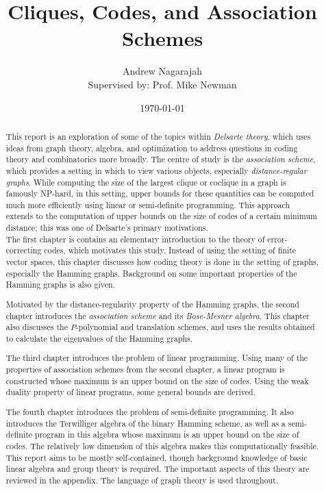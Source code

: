 \documentclass{report}
\title{Cliques, Codes, and Association Schemes}
\author{
  Andrew Nagarajah \\
  Supervised by: Prof. Mike Newman
}
\date{\today}
\begin{document}
\maketitle

\begin{abstract}

  This report is an exploration of some of the topics within \emph{Delsarte
  theory}, which uses ideas from graph theory, algebra, and optimization to
  address questions in coding theory and combinatorics more
  broadly.  The centre of study is the \emph{association scheme}, which provides
  a setting in which to view various objects, especially \emph{distance-regular
  graphs}.  While computing the size of the largest clique or coclique in a
  graph is famously NP-hard, in this setting, upper bounds for these quantities
  can be computed much more efficiently using linear or semi-definite
  programming.  This approach extends to the computation of upper bounds on the
  size of codes of a certain minimum distance; this was one of Delsarte's
  primary motivations.
  \\

  The first chapter is contains an elementary introduction to the theory of
  error-correcting codes, which motivates this study.  Instead of using the
  setting of finite vector spaces, this chapter discusses how coding theory is
  done in the setting of graphs, especially the Hamming graphs.  Background on
  some important properties of the Hamming graphs is also given.

  Motivated by the distance-regularity property of the Hamming graphs, the
  second chapter introduces the \emph{association scheme} and its
  \emph{Bose-Mesner algebra}.  This chapter also discusses the $P$-polynomial
  and translation schemes, and uses the results obtained to calculate the
  eigenvalues of the Hamming graphs.

  The third chapter introduces the problem of linear programming.  Using many
  of the properties of association schemes from the second chapter, a linear
  program is constructed whose maximum is an upper bound on the size of codes.
  Using the weak duality property of linear programs, some general bounds are
  derived.

  The fourth chapter introduces the problem of semi-definite programming.  It
  also introduces the Terwilliger algebra of the binary Hamming scheme, as well
  as a semi-definite program in this algebra whose maximum is an upper bound on
  the size of codes.  The relatively low dimension of this algebra makes this
  computationally feasible.
  \\

  This report aims to be mostly self-contained, though background knowledge of
  basic linear algebra and group theory is required.  The important aspects of
  this theory are reviewed in the appendix.  The language of graph theory is
  used throughout.

\end{abstract}
\end{document}

